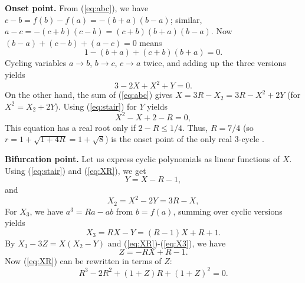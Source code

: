 \documentclass[twocolumn,prl]{revtex4-1}
\begin{document}
\textbf{Onset point.}
%
From (\ref{eq:abc}), we have
$c-b = f(b) - f(a) = -(b+a)(b-a)$;
similar,
$a-c = -(c+b)(c-b)=(c+b)(b+a)(b-a)$.
Now $(b-a) + (c-b) + (a-c) = 0$ means
\[
1 - (b+a) + (c+b)(b+a) = 0.
\]
Cycling variables
$a\rightarrow b$,
$b\rightarrow c$,
$c\rightarrow a$
twice,
and adding up the three versions yields
\begin{equation}
3 - 2X + X^2 + Y = 0.
\label{eq:stair}
\end{equation}
%
On the other hand, the sum of (\ref{eq:abc}) gives
$X = 3R - X_2 = 3R - X^2 + 2Y$ (for $X^2 = X_2 + 2 Y$).
%
Using (\ref{eq:stair}) for $Y$ yields
\begin{equation}
  X^2 - X + 2 - R = 0,
\label{eq:XR}
\end{equation}
This equation has a real root only if $2 - R \le 1/4$.
Thus, $R = 7/4$ (so $r = 1+\sqrt{1+4R} = 1+ \sqrt 8$)
is the onset point of the only real 3-cycle
\cite{saha, bechhoefer, gordon, burm, zhang}.



\textbf{Bifurcation point.}
%
Let us express cyclic polynomials as linear functions of $X$.
Using (\ref{eq:stair}) and (\ref{eq:XR}), we get
\begin{equation}
  Y  = X - R - 1,
\label{eq:Y}
\end{equation}
and
\begin{equation}
  X_2  = X^2 - 2Y = 3R-X,
\label{eq:X2}
\end{equation}
%
For $X_3$,
we have $a^3 = R a - ab$ from $b = f(a)$,
summing over cyclic versions yields
\begin{equation}
X_3 = R X - Y = (R-1) X + R + 1.
\label{eq:X3}
\end{equation}
%
By
$X_3 - 3 Z = X (X_2 - Y)$ and
(\ref{eq:XR})-(\ref{eq:X3}),
we have
\begin{equation}
Z = -RX + R - 1.
\label{eq:Z}
\end{equation}
Now (\ref{eq:XR}) can be rewritten in terms of $Z$:
\begin{equation}
  R^3 - 2R^2 + (1+Z)R + (1+Z)^2 = 0.
\label{eq:RZ}
\end{equation}
\end{document}
